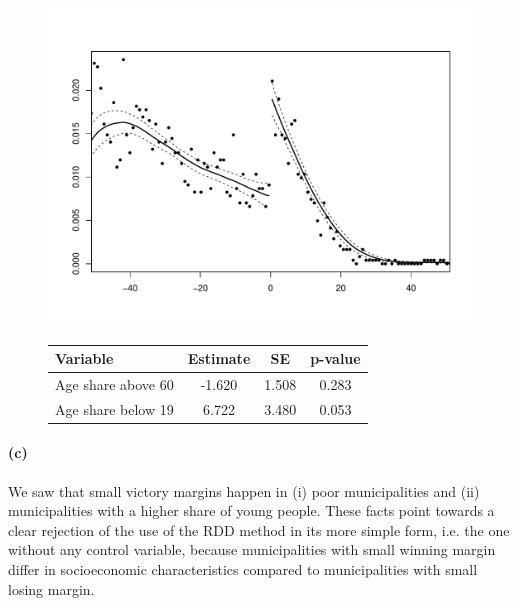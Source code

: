 \documentclass{scrartcl}
\begin{document}
\begin{figure}[h!]
  \centering
  \begin{minipage}[t]{0.48\textwidth}
    \centering
    \includegraphics[width=\linewidth]{output/figures/4_density_test.pdf}
    \label{fig:threshDens}
  \end{minipage}
  \hfill
  \begin{minipage}[t]{0.48\textwidth}
    \centering
    \label{tab:Ex2b}
    \begin{tabular}{lccc}
      \toprule
      Variable            & Estimate & SE    & p-value\\
      \midrule
      Age share above 60  & -1.620   & 1.508 & 0.283\\
      Age share below 19  &  6.722   & 3.480 & 0.053\\
      \bottomrule
    \end{tabular}
  \end{minipage}
\end{figure}

\paragraph*{(c)}
We saw that small victory margins happen in (i) poor municipalities and (ii) municipalities with a higher share of young people. These facts point towards a clear rejection of the use of the RDD method in its more simple form, i.e. the one without any control variable, because municipalities with small winning margin differ in socioeconomic characteristics compared to municipalities with small losing margin. \\
\end{document}
